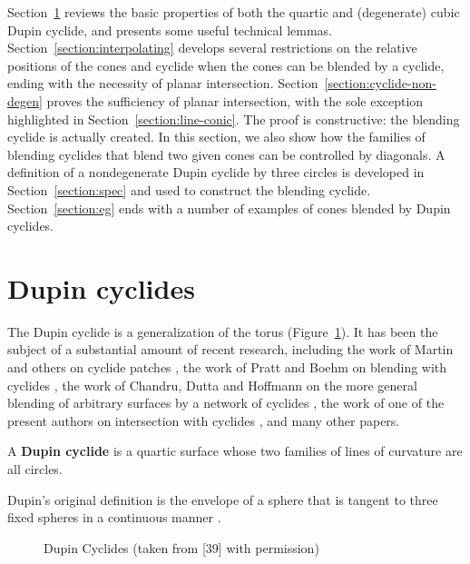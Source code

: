 Section~\ref{section:basic} reviews the basic properties of both
the quartic and (degenerate) cubic Dupin cyclide,
and presents some useful technical lemmas.
Section~\ref{section:interpolating} develops several 
restrictions on the relative positions of the cones and cyclide
when the cones can be blended by a cyclide, ending with the necessity
of planar intersection.
Section~\ref{section:cyclide-non-degen} proves the
sufficiency of planar intersection,
with the sole exception highlighted in Section~\ref{section:line-conic}.
The proof is constructive: the blending cyclide is actually created.
In this section, we also show how the families of blending
cyclides that blend two given cones can be controlled by diagonals.
A definition of a nondegenerate Dupin cyclide by three circles is developed in 
Section~\ref{section:spec} and used to construct the blending cyclide.
Section~\ref{section:eg} ends with a number of examples of cones blended
by Dupin cyclides.

\section{Dupin cyclides}
\label{section:basic}

The Dupin cyclide is a generalization of the torus (Figure~\ref{fig:cyclides}).
It has been the subject of a substantial amount of recent
research, including the work of Martin and others on cyclide patches
\cite{depont:1984,martin:1982,nutbourne-martin:1988,sharrock:1985}, 
the work of Pratt and Boehm on blending with cyclides 
\cite{boehm:1990,pratt:1989,pratt:1990}, 
the work of Chandru, Dutta and Hoffmann 
on the more general blending of arbitrary surfaces by a network of cyclides 
\cite{chandru-dutta-hoffmann:1989,chandru-dutta-hoffmann:1990,dutta:1989},
the work of one of the present authors on intersection with cyclides
\cite{jj92}, and many other papers.

\begin{definition}
A {\bf Dupin cyclide} is a quartic surface whose two families of lines of 
curvature are all circles.  
\end{definition}

Dupin's original definition is the envelope of a sphere that is tangent to
three fixed spheres in a continuous manner \cite{maxwell:1868}.

\begin{figure}
\vspace{18.5cm}
\caption{Dupin Cyclides (taken from [39] with permission)}
\label{fig:cyclides}
\end{figure}

